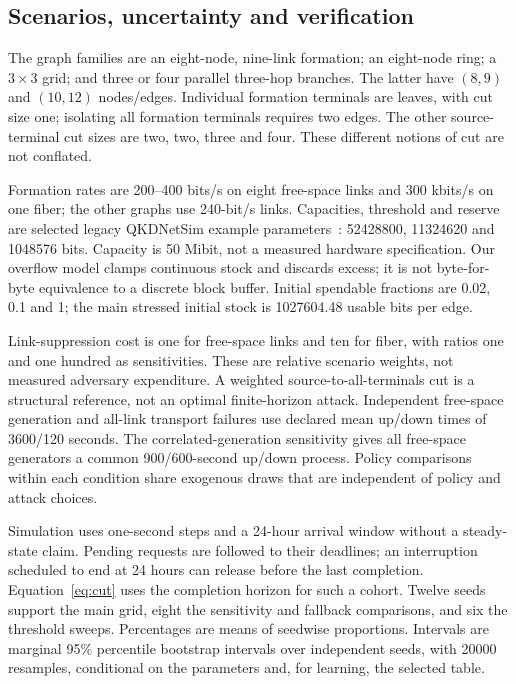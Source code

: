 \documentclass[conference,a4paper]{IEEEtran}
\begin{document}
\subsection{Scenarios, uncertainty and verification}
The graph families are an eight-node, nine-link formation; an eight-node ring; a $3\times3$ grid; and three or four parallel three-hop branches. The latter have $(8,9)$ and $(10,12)$ nodes/edges. Individual formation terminals are leaves, with cut size one; isolating all formation terminals requires two edges. The other source-terminal cut sizes are two, two, three and four. These different notions of cut are not conflated.

Formation rates are 200--400 bits/s on eight free-space links and 300 kbits/s on one fiber; the other graphs use 240-bit/s links. Capacities, threshold and reserve are selected legacy QKDNetSim example parameters~\cite{qkdnetsim}: 52428800, 11324620 and 1048576 bits. Capacity is 50 Mibit, not a measured hardware specification. Our overflow model clamps continuous stock and discards excess; it is not byte-for-byte equivalence to a discrete block buffer. Initial spendable fractions are 0.02, 0.1 and 1; the main stressed initial stock is 1027604.48 usable bits per edge.

Link-suppression cost is one for free-space links and ten for fiber, with ratios one and one hundred as sensitivities. These are relative scenario weights, not measured adversary expenditure. A weighted source-to-all-terminals cut is a structural reference, not an optimal finite-horizon attack. Independent free-space generation and all-link transport failures use declared mean up/down times of 3600/120 seconds. The correlated-generation sensitivity gives all free-space generators a common 900/600-second up/down process. Policy comparisons within each condition share exogenous draws that are independent of policy and attack choices.

Simulation uses one-second steps and a 24-hour arrival window without a steady-state claim. Pending requests are followed to their deadlines; an interruption scheduled to end at 24 hours can release before the last completion. Equation~\ref{eq:cut} uses the completion horizon for such a cohort. Twelve seeds support the main grid, eight the sensitivity and fallback comparisons, and six the threshold sweeps. Percentages are means of seedwise proportions. Intervals are marginal 95\% percentile bootstrap intervals over independent seeds, with 20000 resamples, conditional on the parameters and, for learning, the selected table.
\end{document}
